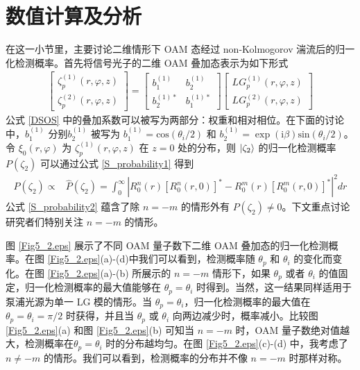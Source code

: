 \documentclass[master]{thesis-uestc}
\begin{document}
\section{数值计算及分析}
在这一小节里，主要讨论二维情形下 OAM 态经过 non-Kolmogorov 湍流后的归一化检测概率。首先将信号光子的二维 OAM 叠加态表示为如下形式
 \begin{equation}
 \begin{split}
\begin{bmatrix} \zeta_{p}^{(1)}(r,\varphi,z) \\ \zeta_{p}^{(2)}(r,\varphi,z) \end{bmatrix}=\begin{bmatrix} b_{1}^{(1)} & b_{2}^{(1)} \\b_{2}^{(1)\ast} & b_{1}^{(1)\ast} \end{bmatrix}\begin{bmatrix} LG_{p}^{(1)}(r,\varphi,z) \\ LG_{p}^{(2)}(r,\varphi,z) \end{bmatrix}
 \label{DSOS}
 \end{split}
\end{equation}
\noindent 公式 \eqref{DSOS} 中的叠加系数可以被写为两部分：权重和相对相位。在下面的讨论中，$b_1^{(1)}$ 分别$b_2^{(1)}$ 被写为 $b_1^{(1)}=\mathrm{cos}(\theta_{i}/2)$ 和 $b_2^{(1)}=\exp{(\mathrm{i}\beta)}\mathrm{sin}(\theta_{i}/2)$。令 $\xi_{0}(r,\varphi)$ 为 $\zeta_{p}^{(1)}(r,\varphi,z)$ 在 $z=0$ 处的分布，则 $\ket{\zeta_2}$ 的归一化检测概率 $P(\zeta_2)$ 可以通过公式 \eqref{S_probability1} 得到
  \begin{equation}
 \begin{split}
P(\zeta_2)\propto&\hat{P}(\zeta_2)=\int_0^{\infty}\left|R_0^{n}(r)\left[R_0^{n}(r,0)\right]^\ast-R_0^{m}(r)\left[R_0^{m}(r,0)\right]^\ast\right|^{2}dr
 \label{S_probability2}
 \end{split}
\end{equation}
\noindent 公式 \eqref{S_probability2} 蕴含了除 $n=-m$ 的情形外有 $P(\zeta_2)\neq 0$。下文重点讨论研究者们特别关注 $n=-m$ 的情形。

图 \ref{Fig5_2.eps} 展示了不同 OAM 量子数下二维 OAM 叠加态的归一化检测概率。在图 \ref{Fig5_2.eps}(a)-(d)中我们可以看到，检测概率随 $\theta_p$ 和 $\theta_i$ 的变化而变化。在图 \ref{Fig5_2.eps}(a)-(b) 所展示的 $n=-m$ 情形下，如果 $\theta_p$ 或者 $\theta_i$ 的值固定，归一化检测概率的最大值能够在 $\theta_p=\theta_i$ 时得到。当然，这一结果同样适用于泵浦光源为单一 LG 模的情形。当 $\theta_p=\theta_i$，归一化检测概率的最大值在 $\theta_p=\theta_i=\pi/2$ 时获得，并且当 $\theta_p$ 或 $\theta_i$ 向两边减少时，概率减小。比较图 \ref{Fig5_2.eps}(a) 和图 \ref{Fig5_2.eps}(b) 可知当 $n=-m$ 时，OAM 量子数绝对值越大，检测概率在$\theta_p=\theta_i$ 时的分布越均匀。在图 \ref{Fig5_2.eps}(c)-(d) 中，我考虑了 $n\neq -m$ 的情形。我们可以看到，检测概率的分布并不像 $n=-m$ 时那样对称。
\end{document}
